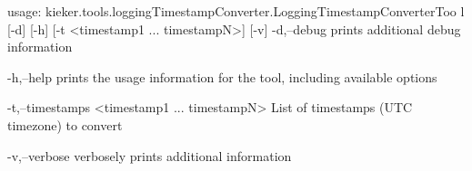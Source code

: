 usage:
       kieker.tools.loggingTimestampConverter.LoggingTimestampConverterToo
       l [-d] [-h] [-t <timestamp1 ... timestampN>] [-v]
 -d,--debug
        prints additional debug information

 -h,--help
        prints the usage information for the tool, including available
        options

 -t,--timestamps <timestamp1 ... timestampN>
        List of timestamps (UTC timezone) to convert

 -v,--verbose
        verbosely prints additional information